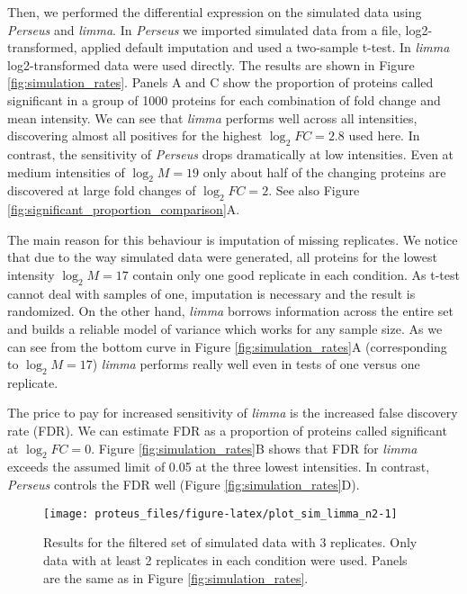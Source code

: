 \documentclass[]{article}
\begin{document}
Then, we performed the differential expression on the simulated data
using \emph{Perseus} and \emph{limma}. In \emph{Perseus} we imported
simulated data from a file, log2-transformed, applied default imputation
and used a two-sample t-test. In \emph{limma} log2-transformed data were
used directly. The results are shown in Figure
\ref{fig:simulation_rates}. Panels A and C show the proportion of
proteins called significant in a group of 1000 proteins for each
combination of fold change and mean intensity. We can see that
\emph{limma} performs well across all intensities, discovering almost
all positives for the highest \(\log_2 FC = 2.8\) used here. In
contrast, the sensitivity of \emph{Perseus} drops dramatically at low
intensities. Even at medium intensities of \(\log_2 M = 19\) only about
half of the changing proteins are discovered at large fold changes of
\(\log_2 FC = 2\). See also Figure
\ref{fig:significant_proportion_comparison}A.

The main reason for this behaviour is imputation of missing replicates.
We notice that due to the way simulated data were generated, all
proteins for the lowest intensity \(\log_2 M = 17\) contain only one
good replicate in each condition. As t-test cannot deal with samples of
one, imputation is necessary and the result is randomized. On the other
hand, \emph{limma} borrows information across the entire set and builds
a reliable model of variance which works for any sample size. As we can
see from the bottom curve in Figure \ref{fig:simulation_rates}A
(corresponding to \(\log_2 M = 17\)) \emph{limma} performs really well
even in tests of one versus one replicate.

The price to pay for increased sensitivity of \emph{limma} is the
increased false discovery rate (FDR). We can estimate FDR as a
proportion of proteins called significant at \(\log_2 FC = 0\). Figure
\ref{fig:simulation_rates}B shows that FDR for \emph{limma} exceeds the
assumed limit of 0.05 at the three lowest intensities. In contrast,
\emph{Perseus} controls the FDR well (Figure
\ref{fig:simulation_rates}D).

\begin{figure}[H]

{\centering \texttt{[image: proteus\_files/figure-latex/plot\_sim\_limma\_n2-1]} 

}

\caption{\label{fig:simulation_filt_rates}Results for the filtered set of simulated data with 3 replicates. Only data with at least 2 replicates in each condition were used. Panels are the same as in Figure \ref{fig:simulation_rates}.}\label{fig:plot_sim_limma_n2}
\end{figure}
\end{document}
